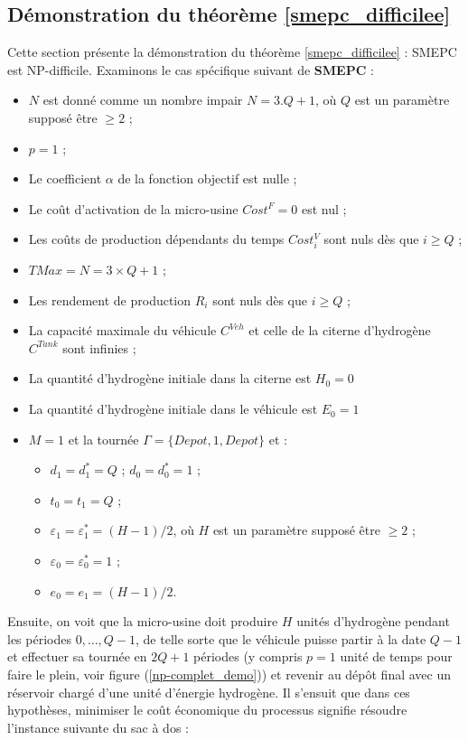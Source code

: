 {\subsection{Démonstration du théorème \ref{smepc_difficilee}}
\label{smepc_difficilee_section}
Cette section présente la démonstration du théorème \ref{smepc_difficilee} : SMEPC est NP-difficile.
Examinons le cas spécifique suivant de \textbf{SMEPC} : 
\begin{itemize}[label=$\square$]
	\item $N$ est donné comme un nombre impair $N = 3.Q + 1$, où $Q$ est un paramètre supposé être $\geq 2$ ;
	\item $p=1$ ;
	\item Le coefficient $\alpha$ de la fonction objectif est nulle ;
	\item Le coût d'activation de la micro-usine $Cost^F=0$ est nul ;
	\item Les coûts de production dépendants du temps $Cost^V_i$ sont nuls dès que $i \geq Q$ ; 
	\item $TMax = N = 3 \times Q +1$ ;
	\item Les rendement de production $R_i$ sont nuls dès que $i \geq Q$ ;
	\item La capacité maximale du véhicule $C^{Veh}$ et celle de la citerne d'hydrogène $C^{Tank}$ sont infinies ;
	\item La quantité d'hydrogène initiale dans la citerne est $H_0=0$
	\item La quantité d'hydrogène initiale dans le véhicule est $E_0=1$
	\item $M=1$ et la tournée $\Gamma=\{Depot, 1, Depot\}$ et :
	\begin{itemize}
		\item $d_1=d^*_1=Q$ ; $d_0=d_0^*=1$ ;
		\item $t_0=t_1=Q$ ;
		\item  $\varepsilon_1=\varepsilon^*_1=(H-1)/2$, où $H$ est un paramètre supposé être $\geq 2$ ;
		\item $\varepsilon_0=\varepsilon^*_0=1$ ;
		\item $e_0=e_1=(H-1)/2$.
	\end{itemize}
\end{itemize}

Ensuite, on voit que la micro-usine doit produire $H $ unités d'hydrogène pendant les périodes $0, \dots, Q - 1$, de telle sorte que le véhicule puisse partir à la date $Q - 1$ et effectuer sa tournée en $2Q + 1$ périodes (y compris $p = 1$ unité de temps pour faire le plein, voir figure (\ref{np-complet_demo})) et revenir au dépôt final avec un réservoir chargé d'une unité d'énergie hydrogène. Il s'ensuit que dans ces hypothèses, minimiser le coût économique du processus signifie résoudre l'instance suivante du sac à dos :

}
